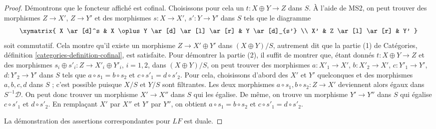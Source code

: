 \begin{proof}
\medskip\noindent
Démontrons que le foncteur affiché est cofinal. Choisissons pour cela un
$t : X \oplus Y \to Z$ dans $S$. À l'aide de MS2, on peut trouver des
morphismes $Z \to X'$, $Z \to Y'$ et des morphismes
$s : X \to X'$, $s' : Y \to Y'$ dans $S$ tels que le diagramme
$$
\xymatrix{
X \ar[d]^s & X \oplus Y \ar[d] \ar[l] \ar[r] & Y \ar[d]_{s'} \\
X' & Z \ar[l] \ar[r] & Y'
}
$$
soit commutatif. Cela montre qu'il existe un morphisme
$Z \to X' \oplus Y'$ dans $(X \oplus Y)/S$, autrement dit que la partie (1)
de Catégories, définition \ref{categories-definition-cofinal}, est satisfaite.
Pour démontrer la partie (2), il suffit de montrer que, étant donnés
$t : X \oplus Y \to Z$ et des morphismes
$s_i \oplus s'_i : Z \to X'_i \oplus Y'_i$, $i = 1, 2$, dans
$(X \oplus Y)/S$, on peut trouver des morphismes
$a : X'_1 \to X'$, $b : X'_2 \to X'$, $c : Y'_1 \to Y'$,
$d : Y'_2 \to Y'$ dans $S$ tels que
$a \circ s_1 = b \circ s_2$ et $c \circ s'_1 = d \circ s'_2$.
Pour cela, choisissons d'abord des $X'$ et $Y'$ quelconques et des morphismes
$a, b, c, d$ dans $S$ ; c'est possible puisque $X/S$ et $Y/S$ sont
filtrantes. Les deux morphismes
$a \circ s_1, b \circ s_2 : Z \to X'$ deviennent alors égaux dans
$S^{-1}\mathcal{D}$. On peut donc trouver un morphisme $X' \to X''$ dans $S$
qui les égalise. De même, on trouve un morphisme $Y' \to Y''$ dans $S$ qui
égalise $c \circ s'_1$ et $d \circ s'_2$. En remplaçant $X'$ par $X''$ et
$Y'$ par $Y''$, on obtient $a \circ s_1 = b \circ s_2$ et
$c \circ s'_1 = d \circ s'_2$.

\medskip\noindent
La démonstration des assertions correspondantes pour $LF$ est duale.
\end{proof}

